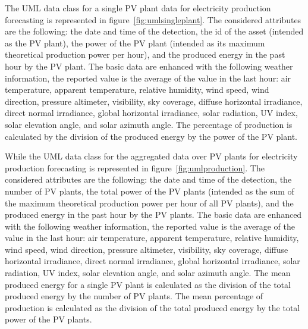 The UML data class for a single PV plant data for electricity production forecasting is represented in figure~\ref{fig:umlsingleplant}.
The considered attributes are the following: the date and time of the detection, the id of the asset (intended as the PV plant), the power of the PV plant (intended as its maximum theoretical production power per hour), and the produced energy in the past hour by the PV plant.
The basic data are enhanced with the following weather information, the reported value is the average of the value in the last hour: air temperature, apparent temperature, relative humidity, wind speed, wind direction, pressure altimeter, visibility, sky coverage, diffuse horizontal irradiance, direct normal irradiance, global horizontal irradiance, solar radiation, UV index, solar elevation angle, and solar azimuth angle.
The percentage of production is calculated by the division of the produced energy by the power of the PV plant.

While the UML data class for the aggregated data over PV plants for electricity production forecasting is represented in figure~\ref{fig:umlproduction}.
The considered attributes are the following: the date and time of the detection, the number of PV plants, the total power of the PV plants (intended as the sum of the maximum theoretical production power per hour of all PV plants), and the produced energy in the past hour by the PV plants.
The basic data are enhanced with the following weather information, the reported value is the average of the value in the last hour: air temperature, apparent temperature, relative humidity, wind speed, wind direction, pressure altimeter, visibility, sky coverage, diffuse horizontal irradiance, direct normal irradiance, global horizontal irradiance, solar radiation, UV index, solar elevation angle, and solar azimuth angle.
The mean produced energy for a single PV plant is calculated as the division of the total produced energy by the number of PV plants.
The mean percentage of production is calculated as the division of the total produced energy by the total power of the PV plants.

